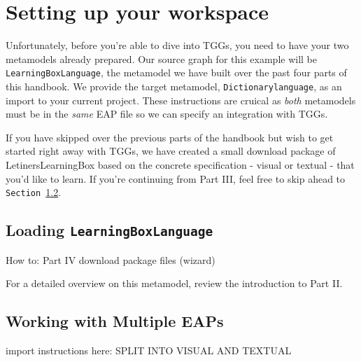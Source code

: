 \newpage
\section{Setting up your workspace}
\genHeader

Unfortunately, before you're able to dive into TGGs, you need to have your two metamodels already prepared. Our source graph for this example will be
\texttt{LearningBoxLanguage}, the metamodel we have built over the past four parts of this handbook. We provide the target metamodel,
\texttt{Dictionarylanguage}, as an import to your current project. These instructions are cruical as \emph{both} metamodels must be in the \emph{same} EAP
file so we can specify an integration with TGGs.

If you have skipped over the previous parts of the handbook but wish to get started right away with TGGs, we have created a small download package of
LetinersLearningBox based on the concrete specification - visual or textual - that you'd like to learn.  If you're continuing from Part III, feel free to skip
ahead to \texttt{Section~\ref{sec:multiEAP}}.

\subsection{Loading \texttt{LearningBoxLanguage}}
How to: Part IV download package files (wizard)

For a detailed overview on this metamodel, review the
introduction to Part II.


\subsection{Working with Multiple EAPs}
\label{sec:multiEAP}
import instructions here: SPLIT INTO VISUAL AND TEXTUAL
